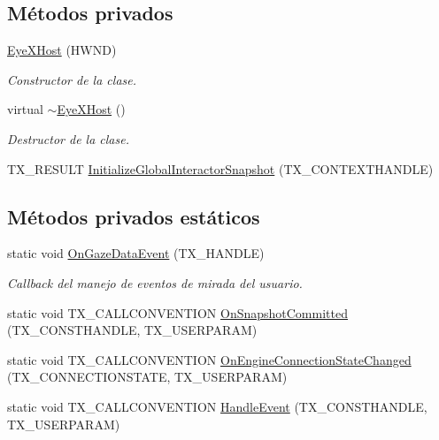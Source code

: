 \subsection*{Métodos privados}
\begin{DoxyCompactItemize}
\item 
\hyperlink{class_eye_x_host_a376b3e2cf679be11303e84091c856a71}{Eye\+X\+Host} (H\+W\+N\+D)
\begin{DoxyCompactList}\small\item\em Constructor de la clase. \end{DoxyCompactList}\item 
virtual \hyperlink{class_eye_x_host_a51725687b656ed9442c3ddc29cc448f3}{$\sim$\+Eye\+X\+Host} ()
\begin{DoxyCompactList}\small\item\em Destructor de la clase. \end{DoxyCompactList}\item 
T\+X\+\_\+\+R\+E\+S\+U\+L\+T \hyperlink{class_eye_x_host_abcf6d191110994711060f65a5b8ac1aa}{Initialize\+Global\+Interactor\+Snapshot} (T\+X\+\_\+\+C\+O\+N\+T\+E\+X\+T\+H\+A\+N\+D\+L\+E)
\end{DoxyCompactItemize}
\subsection*{Métodos privados estáticos}
\begin{DoxyCompactItemize}
\item 
static void \hyperlink{class_eye_x_host_a5c3e688cb906787ead95758baa9cc553}{On\+Gaze\+Data\+Event} (T\+X\+\_\+\+H\+A\+N\+D\+L\+E)
\begin{DoxyCompactList}\small\item\em Callback del manejo de eventos de mirada del usuario. \end{DoxyCompactList}\item 
static void T\+X\+\_\+\+C\+A\+L\+L\+C\+O\+N\+V\+E\+N\+T\+I\+O\+N \hyperlink{class_eye_x_host_a835b09b6d54730778d1c750eaf5a0ba7}{On\+Snapshot\+Committed} (T\+X\+\_\+\+C\+O\+N\+S\+T\+H\+A\+N\+D\+L\+E, T\+X\+\_\+\+U\+S\+E\+R\+P\+A\+R\+A\+M)
\item 
static void T\+X\+\_\+\+C\+A\+L\+L\+C\+O\+N\+V\+E\+N\+T\+I\+O\+N \hyperlink{class_eye_x_host_a8fd3d98accddcae32cbeccfd118d3d66}{On\+Engine\+Connection\+State\+Changed} (T\+X\+\_\+\+C\+O\+N\+N\+E\+C\+T\+I\+O\+N\+S\+T\+A\+T\+E, T\+X\+\_\+\+U\+S\+E\+R\+P\+A\+R\+A\+M)
\item 
static void T\+X\+\_\+\+C\+A\+L\+L\+C\+O\+N\+V\+E\+N\+T\+I\+O\+N \hyperlink{class_eye_x_host_a84d178d9ea0e477e5742810fb2cfd3b7}{Handle\+Event} (T\+X\+\_\+\+C\+O\+N\+S\+T\+H\+A\+N\+D\+L\+E, T\+X\+\_\+\+U\+S\+E\+R\+P\+A\+R\+A\+M)
\end{DoxyCompactItemize}
